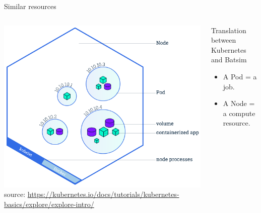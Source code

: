 \documentclass[12pt, aspectratio=43]{beamer}
\newcommand{\backupend}{
   \addtocounter{framenumberappendix}{-\value{framenumber}}
   \addtocounter{framenumber}{\value{framenumberappendix}} 
}
\begin{document}
\begin{frame}{Similar resources}
	\begin{columns}
		\centering
		\includegraphics[width=\textwidth]{../imgs/node-overview.png}
		\tiny{source: \url{https://kubernetes.io/docs/tutorials/kubernetes-basics/explore/explore-intro/}}

		\begin{block}{Translation between Kubernetes and Batsim}
			\begin{itemize}
				\item A Pod = a job.
				\item A Node = a compute resource.
			\end{itemize}
		\end{block}
	\end{columns}
\end{frame}

\backupend
\end{document}
